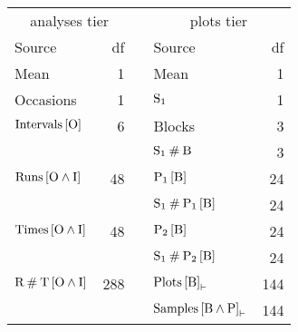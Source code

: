 \begin{center}
\begin{tabular}{lrclr}
\toprule
\multicolumn{2}{c}{analyses tier} & & \multicolumn{2}{c}{plots tier} \\
\cmidrule{1-2} \cmidrule{4-5}
Source & df & & Source & df   \\
\midrule
Mean & 1 & & Mean & 1   \\
\midrule
    Occasions & 1 & & $\mathrm{S}_1$ & 1   \\
\midrule
    $\mathrm{Intervals}\left[\mathrm{O}\right]$ & 6 & & Blocks & 3  \\
 & & &  $\mathrm{S}_1\mathbin{\#}\mathrm{B}$ & 3   \\
\midrule
 $\mathrm{Runs} \left[\mathrm{O}\wedge\mathrm{I}\right]$ & 48 & &
       $\mathrm{P}_1 \left[\mathrm{B}\right]$ &  24  \\
 & & &  $\mathrm{S}_1\mathbin{\#}\mathrm{P}_1\left[\mathrm{B}\right]$ & 24   \\
\midrule
$\mathrm{Times}\left[\mathrm{O}\wedge\mathrm{I}\right]$ & 48 & &
       $\mathrm{P}_2 \left[\mathrm{B}\right]$ &  24 \\
 & & &  $\mathrm{S}_1\mathbin{\#}\mathrm{P}_2\left[\mathrm{B}\right]$ & 24  \\
\midrule
$\mathrm{R}\mathbin{\#}\mathrm{T}\left[\mathrm{O}\wedge\mathrm{I}\right]$ & 288 & &
       $\mathrm{Plots}\left[\mathrm{B}\right]_{\mathbin{\vdash}}$ &  144 \\

& & &
$\mathrm{Samples}\left[\mathrm{B}\wedge\mathrm{P}\right]_{\mathbin{\vdash}}$
              & 144  \\
\bottomrule
\end{tabular}
\end{center}

